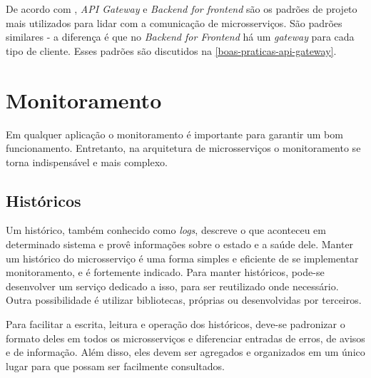 De acordo com , \emph{API Gateway} e \emph{Backend for frontend} são os padrões de projeto mais utilizados para lidar com a comunicação de microsserviços. São padrões similares - a diferença é que no \emph{Backend for Frontend} há um \emph{gateway} para cada tipo de cliente. Esses padrões são discutidos na \autoref{boas-praticas-api-gateway}. 


\section{Monitoramento}

Em qualquer aplicação o monitoramento é importante para garantir um bom funcionamento. Entretanto, na arquitetura de microsserviços o monitoramento se torna indispensável e mais complexo. %


\subsection{Históricos}

Um histórico, também conhecido como \emph{logs}, descreve o que aconteceu em determinado sistema e provê informações sobre o estado e a saúde dele. Manter um histórico do microsserviço é uma forma simples e eficiente de se implementar monitoramento, e é fortemente indicado. Para manter históricos, pode-se desenvolver um serviço dedicado a isso, para ser reutilizado onde necessário. Outra possibilidade é utilizar bibliotecas, próprias ou desenvolvidas por terceiros.

Para facilitar a escrita, leitura e operação dos históricos, deve-se padronizar o formato deles em todos os microsserviços e diferenciar entradas de erros, de avisos e de informação. Além disso, eles devem ser agregados e organizados em um único lugar para que possam ser facilmente consultados.



